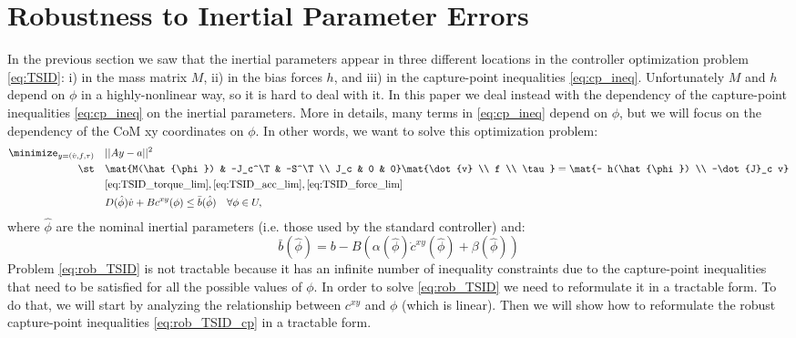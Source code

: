 \section{Robustness to Inertial Parameter Errors}
\label{sec:robustness}
In the previous section we saw that the inertial parameters appear in three different locations in the controller optimization problem \eqref{eq:TSID}: i) in the mass matrix $M$, ii) in the bias forces $h$, and iii) in the capture-point inequalities \eqref{eq:cp_ineq}.
Unfortunately $M$ and $h$ depend on $\phi$ in a highly-nonlinear way, so it is hard to deal with it.
In this paper we deal instead with the dependency of the capture-point inequalities \eqref{eq:cp_ineq} on the inertial parameters.
More in details, many terms in \eqref{eq:cp_ineq} depend on $\phi$, but we will focus on the dependency of the CoM xy coordinates on $\phi$.
In other words, we want to solve this optimization problem:
\begin{subequations} 
\label{eq:rob_TSID}
\begin{align} 
\minimize_{y=(\dot{v}, f, \tau)} \quad &|| A y - a||^2 \nonumber \\
\st \quad & \mat{M(\hat{\phi}) & -J_c^\T & -S^\T \\ J_c & 0 & 0} \mat{\dot{v} \\ f \\ \tau} = \mat{- h(\hat{\phi}) \\ -\dot{J}_c v} \\
& \eqref{eq:TSID_torque_lim}, \eqref{eq:TSID_acc_lim}, \eqref{eq:TSID_force_lim} \nonumber \\
& D(\hat{\phi}) \dot{v} + B c^{xy}(\phi) \le \bar{b}(\hat{\phi}) \quad \forall \phi \in U, \label{eq:rob_TSID_cp}
\end{align} 
\end{subequations}
where $\hat{\phi}$ are the nominal inertial parameters (i.e. those used by the standard controller) and:
$$
\bar{b}(\hat{\phi}) = b - B (\alpha(\hat{\phi}) \dot{c}^{xy}(\hat{\phi}) + \beta(\hat{\phi}))
$$
Problem \eqref{eq:rob_TSID} is not tractable because it has an infinite number of inequality constraints due to the capture-point inequalities that need to be satisfied for all the possible values of $\phi$.
In order to solve \eqref{eq:rob_TSID} we need to reformulate it in a tractable form.
To do that, we will start by analyzing the relationship between $c^{xy}$ and $\phi$ (which is linear).
Then we will show how to reformulate the robust capture-point inequalities \eqref{eq:rob_TSID_cp} in a tractable form.

